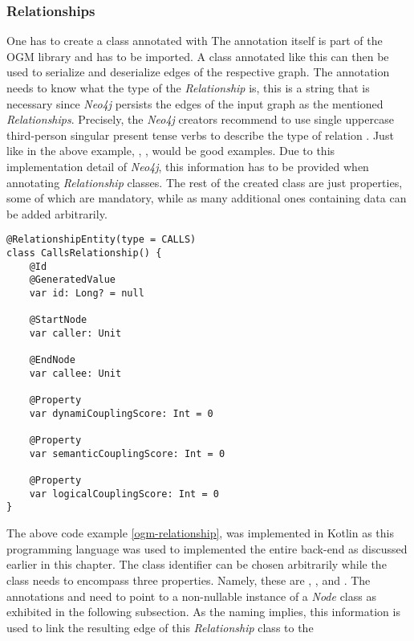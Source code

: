 \documentclass[12pt,a4paper]{report}
\begin{document}
\subsubsection{Relationships}
One has to create a class annotated with 
The annotation itself is part of the OGM library and has to be imported.
A class annotated like this can then be used to serialize and deserialize edges
of the respective graph. The annotation needs to know what the type of the
\textit{Relationship} is, this is a string that is necessary since \textit{Neo4j}
persists the edges of the input graph as the mentioned \textit{Relationships}.
Precisely, the \textit{Neo4j} creators recommend to use single uppercase third-person
singular present tense verbs to describe the type of relation \cite{neo4j-ogm}.
Just like in the above example, , ,  would
be good examples. Due to this implementation detail of \textit{Neo4j},
this information has to be provided when annotating \textit{Relationship} classes.
The rest of the created class are just properties, some of which are mandatory,
while as many additional ones containing data can be added arbitrarily.
\smaller
\begin{lstlisting}[caption=Relationship OGM class, label=ogm-relationship, breaklines=true]
@RelationshipEntity(type = CALLS)
class CallsRelationship() {
    @Id
    @GeneratedValue
    var id: Long? = null

    @StartNode
    var caller: Unit

    @EndNode
    var callee: Unit

    @Property
    var dynamiCouplingScore: Int = 0

    @Property
    var semanticCouplingScore: Int = 0

    @Property
    var logicalCouplingScore: Int = 0
}
\end{lstlisting}
\normalsize
The above code example \ref{ogm-relationship}, was implemented in Kotlin
as this programming language was used to implemented the entire back-end
as discussed earlier in this chapter.
The class identifier can be chosen arbitrarily while the class needs to
encompass three properties.
Namely, these are , , and .
The annotations  and  need to point
to a non-nullable instance of a \textit{Node} class as exhibited in the
following subsection. As the naming implies, this information is used
to link the resulting edge of this \textit{Relationship} class to the
\end{document}
